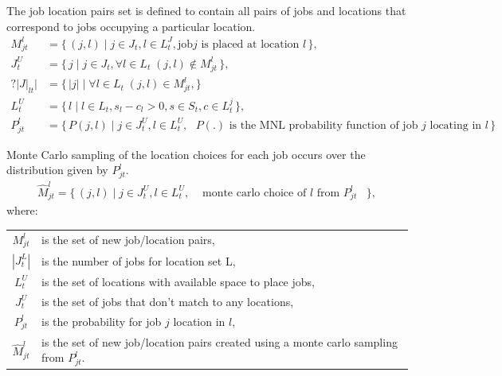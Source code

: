 The job location pairs set is defined to contain all pairs of jobs
and locations that correspond to jobs occupying a particular
location.
\begin{align}
M^l_{jt} &= \{\, (j, l) \mid j \in J_{t}, l \in L^J_{t}, \text{job
$j$ is placed at location $l$} \,\},\\
%
%
J^U_{t} &= \{\, j \mid j \in J_{t}, \forall l \in L_{t} \; (j, l) \notin M^l_{jt} \,\},\\
%
%
?|J|_{lt}| & = \{\, |j| \mid \forall l \in L_{t} \; (j, l) \in M^l_{jt}, \}\, \\
L^U_{t} &= \{\, l \mid l \in L_{t}, s_l - c_l > 0, s \in S_{t}, c \in L^j_{t} \,\},\\
%
P^l_{jt} &= \{\, P(j, l) \mid j \in J^U_{t}, l \in L^U_{t}, \text{ $P(.)$ is the MNL
probability function of job $j$ locating in $l$} \,\}
\end{align}

Monte Carlo sampling of the location choices for each job
occurs over the distribution given by $P^l_{jt}$.
\begin{align}
\hat{M}^l_{jt} = \{\, (j, l) \mid j \in J^U_{t}, l \in L^U_{t}, &\text{ monte carlo
choice of $l$ from $P^l_{jt}$ } \,\},
\end{align}
where:
\begin{center}
\begin{tabular}{c p{5.5in}}
$M^l_{jt}$ & is the set of new job/location pairs, \\
$|J^L_t|$ & is the number of jobs for location set L, \\
$L^U_t$ & is the set of locations with available space to place jobs, \\
$J^U_t$ & is the set of jobs that don't match to any locations, \\
$P^l_{jt}$ & is the probability for job $j$ location in $l$, \\
$\hat{M}^l_{jt}$ & is the set of new job/location pairs created using a monte carlo sampling from $P^l_{jt}$.\\
\end{tabular}
\end{center}

